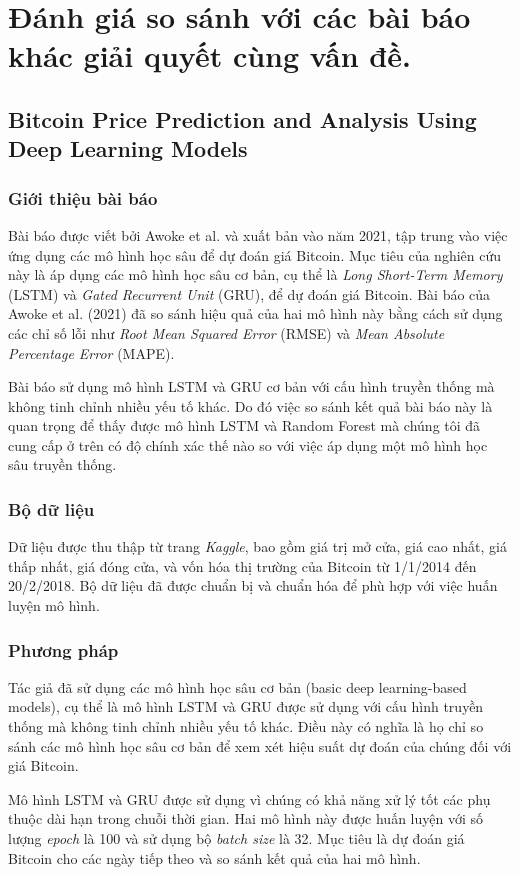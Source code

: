 \chapter{Đánh giá so sánh với các bài báo khác giải quyết cùng vấn đề.}
\section{Bitcoin Price Prediction and Analysis Using Deep Learning Models}
\subsection{Giới thiệu bài báo}
Bài báo được viết bởi Awoke et al. \cite{5} và xuất bản vào năm 2021, tập trung vào việc ứng dụng các mô hình học sâu để dự đoán giá Bitcoin. Mục tiêu của nghiên cứu này là áp dụng các mô hình học sâu cơ bản, cụ thể là \textit{Long Short-Term Memory} (LSTM) và \textit{Gated Recurrent Unit} (GRU), để dự đoán giá Bitcoin. Bài báo của Awoke et al. (2021) đã so sánh hiệu quả của hai mô hình này bằng cách sử dụng các chỉ số lỗi như \textit{Root Mean Squared Error} (RMSE) và \textit{Mean Absolute Percentage Error} (MAPE).

Bài báo sử dụng mô hình LSTM và GRU cơ bản với cấu hình truyền thống mà không tinh chỉnh nhiều yếu tố khác. Do đó việc so sánh kết quả bài báo này là quan trọng để thấy được mô hình LSTM và Random Forest mà chúng tôi đã cung cấp ở trên có độ chính xác thế nào so với việc áp dụng một mô hình học sâu truyền thống.
\subsection{Bộ dữ liệu}
Dữ liệu được thu thập từ trang \textit{Kaggle}, bao gồm giá trị mở cửa, giá cao nhất, giá thấp nhất, giá đóng cửa, và vốn hóa thị trường của Bitcoin từ 1/1/2014 đến 20/2/2018. Bộ dữ liệu đã được chuẩn bị và chuẩn hóa để phù hợp với việc huấn luyện mô hình.
\subsection{Phương pháp}
Tác giả đã sử dụng các mô hình học sâu cơ bản (basic deep learning-based models), cụ thể là mô hình LSTM và GRU được sử dụng với cấu hình truyền thống mà không tinh chỉnh nhiều yếu tố khác. Điều này có nghĩa là họ chỉ so sánh các mô hình học sâu cơ bản để xem xét hiệu suất dự đoán của chúng đối với giá Bitcoin.

Mô hình LSTM và GRU được sử dụng vì chúng có khả năng xử lý tốt các phụ thuộc dài hạn trong chuỗi thời gian. Hai mô hình này được huấn luyện với số lượng \textit{epoch} là 100 và sử dụng bộ \textit{batch size} là 32. Mục tiêu là dự đoán giá Bitcoin cho các ngày tiếp theo và so sánh kết quả của hai mô hình.

